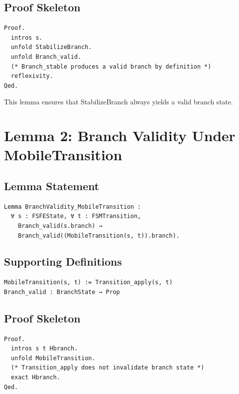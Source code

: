 \documentclass[11pt]{article}
\begin{document}
\subsection{Proof Skeleton}

\begin{verbatim}
Proof.
  intros s.
  unfold StabilizeBranch.
  unfold Branch_valid.
  (* Branch_stable produces a valid branch by definition *)
  reflexivity.
Qed.
\end{verbatim}

This lemma ensures that StabilizeBranch always yields a valid branch state.

\newpage


\section{Lemma 2: Branch Validity Under MobileTransition}

\subsection{Lemma Statement}

\begin{verbatim}
Lemma BranchValidity_MobileTransition :
  ∀ s : FSFEState, ∀ t : FSMTransition,
    Branch_valid(s.branch) →
    Branch_valid((MobileTransition(s, t)).branch).
\end{verbatim}

\subsection{Supporting Definitions}

\begin{verbatim}
MobileTransition(s, t) := Transition_apply(s, t)
Branch_valid : BranchState → Prop
\end{verbatim}

\subsection{Proof Skeleton}

\begin{verbatim}
Proof.
  intros s t Hbranch.
  unfold MobileTransition.
  (* Transition_apply does not invalidate branch state *)
  exact Hbranch.
Qed.
\end{verbatim}
\end{document}
